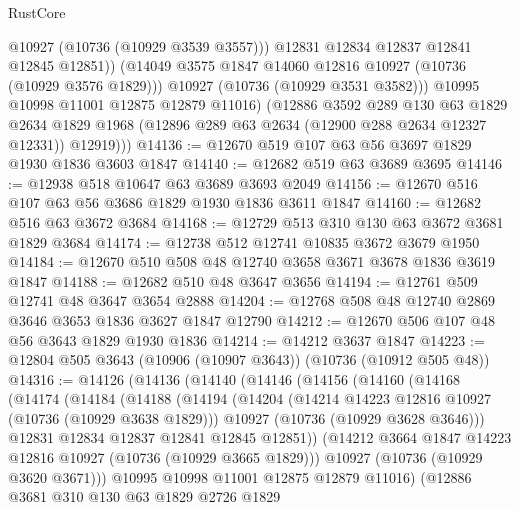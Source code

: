 \begin{lexlean}{RustCore}
\begin{coremodule}
                  @10927
                  (@10736 (@10929 @3539 @3557)))
                @12831
                @12834
                @12837
                @12841
                @12845
                @12851))
            (@14049 @3575 @1847 @14060 @12816 @10927 (@10736 (@10929 @3576 @1829)))
            @10927
            (@10736 (@10929 @3531 @3582)))
          @10995
          @10998
          @11001
          @12875
          @12879
          @11016)
        (@12886
          @3592
          @289
          @130
          @63
          @1829
          @2634
          @1829
          @1968
          (@12896 @289 @63 @2634 (@12900 @288 @2634 @12327 @12331))
          @12919)))
@14136 := @12670 @519 @107 @63 @56 @3697 @1829 @1930 @1836 @3603 @1847
@14140 := @12682 @519 @63 @3689 @3695
@14146 := @12938 @518 @10647 @63 @3689 @3693 @2049
@14156 := @12670 @516 @107 @63 @56 @3686 @1829 @1930 @1836 @3611 @1847
@14160 := @12682 @516 @63 @3672 @3684
@14168 := @12729 @513 @310 @130 @63 @3672 @3681 @1829 @3684
@14174 := @12738 @512 @12741 @10835 @3672 @3679 @1950
@14184 := @12670 @510 @508 @48 @12740 @3658 @3671 @3678 @1836 @3619 @1847
@14188 := @12682 @510 @48 @3647 @3656
@14194 := @12761 @509 @12741 @48 @3647 @3654 @2888
@14204 := @12768 @508 @48 @12740 @2869 @3646 @3653 @1836 @3627 @1847 @12790
@14212 := @12670 @506 @107 @48 @56 @3643 @1829 @1930 @1836
@14214 := @14212 @3637 @1847
@14223 := @12804 @505 @3643 (@10906 (@10907 @3643)) (@10736 (@10912 @505 @48))
@14316 := @14126
    (@14136
      (@14140
        (@14146
          (@14156
            (@14160
              (@14168
                (@14174
                  (@14184
                    (@14188
                      (@14194
                        (@14204
                          (@14214 @14223 @12816 @10927 (@10736 (@10929 @3638 @1829)))
                          @10927
                          (@10736 (@10929 @3628 @3646)))
                        @12831
                        @12834
                        @12837
                        @12841
                        @12845
                        @12851))
                    (@14212 @3664 @1847 @14223 @12816 @10927 (@10736 (@10929 @3665 @1829)))
                    @10927
                    (@10736 (@10929 @3620 @3671)))
                  @10995
                  @10998
                  @11001
                  @12875
                  @12879
                  @11016)
                (@12886
                  @3681
                  @310
                  @130
                  @63
                  @1829
                  @2726
                  @1829

\end{coremodule}
\end{lexlean}
